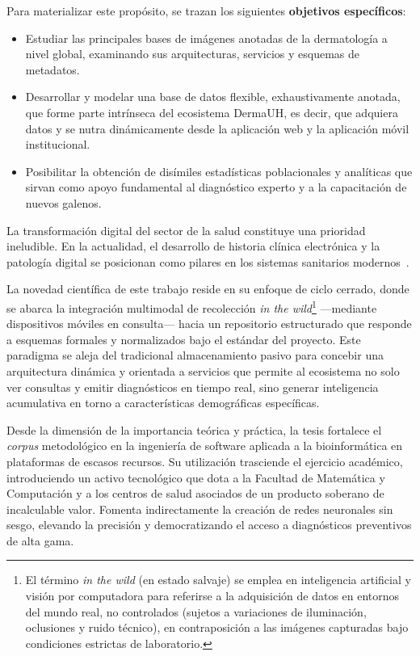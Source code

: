 Para materializar este propósito, se trazan los siguientes \textbf{objetivos específicos}:
\begin{itemize}
    \item Estudiar las principales bases de imágenes anotadas de la dermatología a 
    nivel global, examinando sus arquitecturas, servicios y esquemas de metadatos.
    \item Desarrollar y modelar una base de datos flexible, exhaustivamente anotada, que forme parte intrínseca 
    del ecosistema DermaUH, es decir, que adquiera datos y se nutra dinámicamente desde la aplicación web y la 
    aplicación móvil institucional.
    \item Posibilitar la obtención de disímiles estadísticas 
    poblacionales y analíticas que sirvan como apoyo fundamental al diagnóstico experto y a la capacitación 
    de nuevos galenos.
\end{itemize}


La transformación digital del sector de la salud constituye una prioridad ineludible. En la actualidad, el 
desarrollo de historia clínica electrónica y la patología digital se posicionan como pilares en los 
sistemas sanitarios modernos~\cite{prensalatina_dermauh}. 

La novedad científica de este trabajo reside en su enfoque de ciclo cerrado, donde se abarca 
la integración multimodal de recolección \textit{in the wild}\footnote{El término \textit{in the wild} (en estado salvaje) se emplea en inteligencia artificial y visión por computadora para referirse a la adquisición de datos en entornos del mundo real, no controlados (sujetos a variaciones de iluminación, oclusiones y ruido técnico), en contraposición a las imágenes capturadas bajo condiciones estrictas de laboratorio.} ---mediante dispositivos móviles en 
consulta--- hacia un repositorio estructurado que responde a esquemas formales y normalizados bajo el 
estándar del proyecto. Este paradigma se aleja del tradicional almacenamiento pasivo para concebir 
una arquitectura dinámica y orientada a servicios que permite al ecosistema no solo ver consultas y 
emitir diagnósticos en tiempo real, sino generar inteligencia acumulativa en torno a características 
demográficas específicas. 

Desde la dimensión de la importancia teórica y práctica, la tesis fortalece el \textit{corpus} metodológico 
en la ingeniería de software aplicada a la bioinformática en plataformas de escasos recursos. Su utilización 
trasciende el ejercicio académico, introduciendo un activo tecnológico que dota a la Facultad de Matemática 
y Computación y a los centros de salud asociados de un producto soberano de incalculable valor. Fomenta 
indirectamente la creación de redes neuronales sin sesgo, elevando la precisión y democratizando el acceso 
a diagnósticos preventivos de alta gama.


